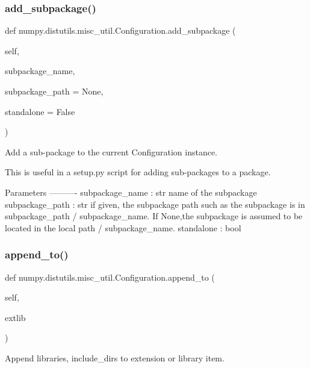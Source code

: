 \subsubsection{\texorpdfstring{add\+\_\+subpackage()}{add\_subpackage()}}
{\footnotesize\ttfamily def numpy.\+distutils.\+misc\+\_\+util.\+Configuration.\+add\+\_\+subpackage (\begin{DoxyParamCaption}\item[{}]{self,  }\item[{}]{subpackage\+\_\+name,  }\item[{}]{subpackage\+\_\+path = {\ttfamily None},  }\item[{}]{standalone = {\ttfamily False} }\end{DoxyParamCaption})}

\begin{DoxyVerb}Add a sub-package to the current Configuration instance.

This is useful in a setup.py script for adding sub-packages to a
package.

Parameters
----------
subpackage_name : str
    name of the subpackage
subpackage_path : str
    if given, the subpackage path such as the subpackage is in
    subpackage_path / subpackage_name. If None,the subpackage is
    assumed to be located in the local path / subpackage_name.
standalone : bool
\end{DoxyVerb}
 \mbox{\label{classnumpy_1_1distutils_1_1misc__util_1_1Configuration_ac13ebf51e3a16314602e64c7c8aa5e8b}} 
\subsubsection{\texorpdfstring{append\+\_\+to()}{append\_to()}}
{\footnotesize\ttfamily def numpy.\+distutils.\+misc\+\_\+util.\+Configuration.\+append\+\_\+to (\begin{DoxyParamCaption}\item[{}]{self,  }\item[{}]{extlib }\end{DoxyParamCaption})}

\begin{DoxyVerb}Append libraries, include_dirs to extension or library item.
\end{DoxyVerb}
 \mbox{\label{classnumpy_1_1distutils_1_1misc__util_1_1Configuration_a8148d9d8c52604747ead6817c89979f3}} 
